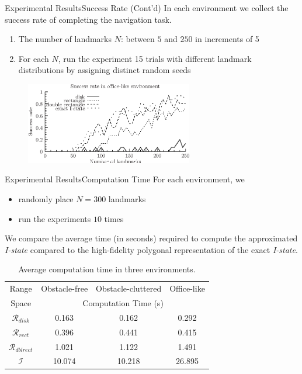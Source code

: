\begin{frame}{Experimental Results}{Success Rate (Cont'd)}
In each environment we collect the success rate of completing the navigation
task. 
\begin{enumerate}
\item The number of landmarks $N$: between $5$ and $250$ in increments of 5
\item For each $N$, run the experiment 15 trials with different landmark
  distributions by assigning distinct random seeds
\end{enumerate}
\begin{figure}
  \begin{center}
    \includegraphics[width=0.65\textwidth]{figs/exp_num_cse}
  \end{center}
  \label{fig:sucRate1}
\end{figure}
\end{frame}


\begin{frame}{Experimental Results}{Computation Time}
  For each environment, we
  \begin{itemize}
  \item randomly place $N = 300$ landmarks 
  \item run the  experiments $10$ times
  \end{itemize} 
  \begin{block}{}
    We compare the average time (in seconds) required to compute the approximated
    \emph{I-state} compared to the high-fidelity polygonal representation of the
    exact \emph{I-state}.
  \end{block}
\begin{table}
  \footnotesize\centering
    \begin{tabular}{cccc} 
    \hline
    Range & Obstacle-free & Obstacle-cluttered & Office-like\\
    Space & \multicolumn{3}{c}{Computation Time (s)}  \\ 
    \hline
    $\mathcal{R}_{disk}$ & 0.163  & 0.162   & 0.292  \\ 
    \hline
    $\mathcal{R}_{rect}$ & 0.396   & 0.441  & 0.415  \\
    \hline
    $\mathcal{R}_{dblrect}$ & 1.021  & 1.122  & 1.491  \\
    \hline
    $\mathcal{I}$ & 10.074  & 10.218  & 26.895  \\
    \hline
    \end{tabular}
    \caption{{Average computation time in three environments.}}
\end{table}
\end{frame}

